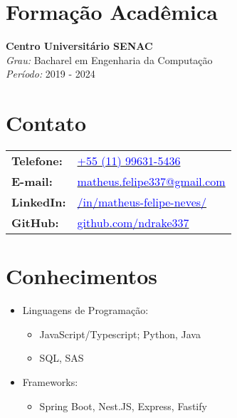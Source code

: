 \documentclass[a4paper,10pt]{article}
\begin{document}
\begin{minipage}[t]{0.60\textwidth}
    \section*{\faBook \space Formação Acadêmica}
        \textbf{Centro Universitário SENAC} \\
        \textit{Grau:} Bacharel em Engenharia da Computação \\
        \textit{Período:} 2019 - 2024
\end{minipage}%
\hfill
\begin{minipage}[t]{0.3\textwidth}
    \section*{\faAddressCard \space Contato}
    
    \begin{tabular}{l l}
        \textbf{Telefone:} & \href{tel:+5511996315436}{\textcolor{blue}{+55 (11) 99631-5436}} \\
        \textbf{E-mail:} & \href{mailto:matheus.felipe337@gmail.com}{\textcolor{blue}{matheus.felipe337@gmail.com}} \\
        \textbf{LinkedIn:} & \href{https://www.linkedin.com/in/matheus-felipe-neves/}{\textcolor{blue}{/in/matheus-felipe-neves/}} \\
        \textbf{GitHub:} & \href{https://github.com/ndrake337}{\textcolor{blue}{github.com/ndrake337}}
    \end{tabular}

    \section*{\faTerminal \space Conhecimentos}

    \begin{itemize}[left=0pt, label={}]
        \item Linguagens de Programação:
        \begin{itemize}
            \item JavaScript/Typescript; Python, Java
            \item SQL, SAS
        \end{itemize}
        
        \item Frameworks:
        \begin{itemize}
            \item Spring Boot, Nest.JS, Express, Fastify
        \end{itemize}
        

\end{itemize}
\end{minipage}
\end{document}

